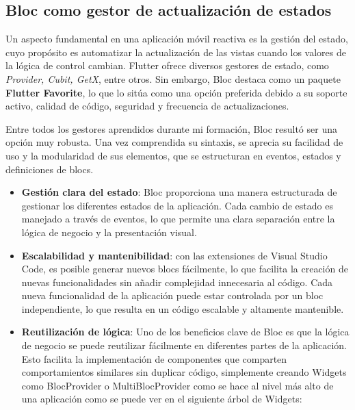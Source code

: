 	\subsection{Bloc como gestor de actualización de estados}
	Un aspecto fundamental en una aplicación móvil reactiva es la gestión del estado, cuyo propósito es automatizar la actualización de las vistas cuando los valores de la lógica de control cambian. Flutter ofrece diversos gestores de estado, como \textit{Provider, Cubit, GetX}, entre otros. Sin embargo, Bloc destaca como un paquete \textbf{Flutter Favorite}, lo que lo sitúa como una opción preferida debido a su soporte activo, calidad de código, seguridad y frecuencia de actualizaciones.
	
	Entre todos los gestores aprendidos durante mi formación, Bloc resultó ser una opción muy robusta. Una vez comprendida su sintaxis, se aprecia su facilidad de uso y la modularidad de sus elementos, que se estructuran en eventos, estados y definiciones de blocs.
	\begin{itemize}
		
		\item \textbf{Gestión clara del estado}: Bloc proporciona una manera estructurada de gestionar los diferentes estados de la aplicación. Cada cambio de estado es manejado a través de eventos, lo que permite una clara separación entre la lógica de negocio y la presentación visual.
		
		\item \textbf{Escalabilidad y mantenibilidad}: con las extensiones de Visual Studio Code, es posible generar nuevos blocs fácilmente, lo que facilita la creación de nuevas funcionalidades sin añadir complejidad innecesaria al código. Cada nueva funcionalidad de la aplicación puede estar controlada por un bloc independiente, lo que resulta en un código escalable y altamente mantenible.
				
		\item \textbf{Reutilización de lógica}: Uno de los beneficios clave de Bloc es que la lógica de negocio se puede reutilizar fácilmente en diferentes partes de la aplicación. Esto facilita la implementación de componentes que comparten comportamientos similares sin duplicar código, simplemente creando Widgets como BlocProvider o MultiBlocProvider como se hace al nivel más alto de una aplicación como se puede ver en el siguiente árbol de Widgets:
		
		
				
	\end{itemize}
	
